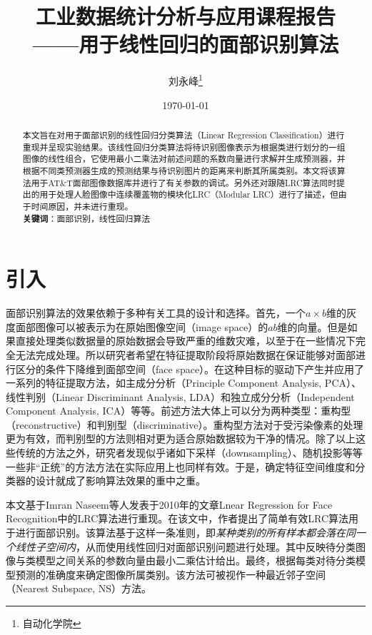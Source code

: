 \documentclass[UTF8]{ctexart}
\title{工业数据统计分析与应用课程报告\\——用于线性回归的面部识别算法}
\author{刘永峰\thanks{自动化学院}}
\date{\today}
\begin{document}
\maketitle %
\begin{abstract}
    本文旨在对用于面部识别的线性回归分类算法（Linear Regression Classification）进行重现并呈现实验结果。该线性回归分类算法将待识别图像表示为根据类进行划分的一组图像的线性组合，它使用最小二乘法对前述问题的系数向量进行求解并生成预测器，并根据不同类预测器生成的预测结果与待识别图片的距离来判断其所属类别。本文将该算法用于AT\&T面部图像数据库并进行了有关参数的调试。另外还对跟随LRC算法同时提出的用于处理人脸图像中连续覆盖物的模块化LRC（Modular LRC）进行了描述，但由于时间原因，并未进行重现。\\
    \textbf{关键词}：面部识别，线性回归算法
\end{abstract}
\section{引入}\label{sec-1}
面部识别算法的效果依赖于多种有关工具的设计和选择。首先，一个\(a \times b\)维的灰度面部图像可以被表示为在原始图像空间（image space）的\(ab\)维的向量。但是如果直接处理类似数据量的原始数据会导致严重的维数灾难，以至于在一些情况下完全无法完成处理。所以研究者希望在特征提取阶段将原始数据在保证能够对面部进行区分的条件下降维到面部空间（face space）。在这种目标的驱动下产生并应用了一系列的特征提取方法，如主成分分析（Principle Component Analysis, PCA）、线性判别（Linear Discriminant Analysis, LDA）和独立成分分析（Independent Component Analysis, ICA）等等。前述方法大体上可以分为两种类型：重构型（reconstructive）和判别型（discriminative）。重构型方法对于受污染像素的处理更为有效，而判别型的方法则相对更为适合原始数据较为干净的情况。除了以上这些传统的方法之外，研究者发现似乎诸如下采样（downsampling）、随机投影等等一些非“正统”的方法方法在实际应用上也同样有效。于是，确定特征空间维度和分类器的设计就成了影响算法效果的重中之重。\par
本文基于Imran Naseem等人发表于2010年的文章Lnear Regression for Face Recognition中的LRC算法进行重现。在该文中，作者提出了简单有效LRC算法用于进行面部识别。该算法基于这样一条准则，即\textit{某种类别的所有样本都会落在同一个线性子空间内}，从而使用线性回归对面部识别问题进行处理。其中反映待分类图像与类模型之间关系的参数向量由最小二乘估计给出。最终，根据每类对待分类模型预测的准确度来确定图像所属类别。该方法可被视作一种最近邻子空间（Nearest Subspace, NS）方法。\par
\end{document}
